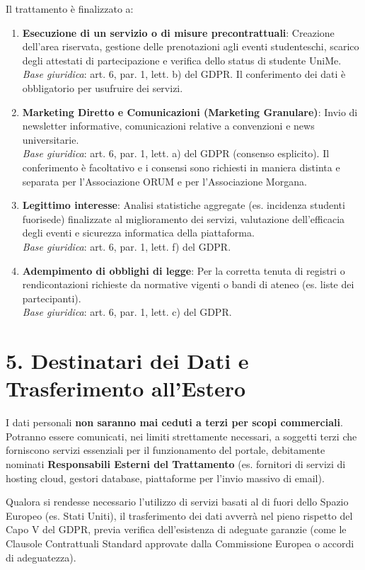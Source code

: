 \documentclass[a4paper,11pt]{article}
\begin{document}
Il trattamento è finalizzato a:
\begin{enumerate}[leftmargin=*]
    \item \textbf{Esecuzione di un servizio o di misure precontrattuali}: Creazione dell’area riservata, gestione delle prenotazioni agli eventi studenteschi, scarico degli attestati di partecipazione e verifica dello status di studente UniMe.\\
    \textit{Base giuridica}: art. 6, par. 1, lett. b) del GDPR. Il conferimento dei dati è obbligatorio per usufruire dei servizi.
    \item \textbf{Marketing Diretto e Comunicazioni (Marketing Granulare)}: Invio di newsletter informative, comunicazioni relative a convenzioni e news universitarie.\\
    \textit{Base giuridica}: art. 6, par. 1, lett. a) del GDPR (consenso esplicito). Il conferimento è facoltativo e i consensi sono richiesti in maniera distinta e separata per l'Associazione ORUM e per l'Associazione Morgana.
    \item \textbf{Legittimo interesse}: Analisi statistiche aggregate (es. incidenza studenti fuorisede) finalizzate al miglioramento dei servizi, valutazione dell'efficacia degli eventi e sicurezza informatica della piattaforma.\\
    \textit{Base giuridica}: art. 6, par. 1, lett. f) del GDPR.
    \item \textbf{Adempimento di obblighi di legge}: Per la corretta tenuta di registri o rendicontazioni richieste da normative vigenti o bandi di ateneo (es. liste dei partecipanti).\\
    \textit{Base giuridica}: art. 6, par. 1, lett. c) del GDPR.
\end{enumerate}

\section*{5. Destinatari dei Dati e Trasferimento all'Estero}

I dati personali \textbf{non saranno mai ceduti a terzi per scopi commerciali}. Potranno essere comunicati, nei limiti strettamente necessari, a soggetti terzi che forniscono servizi essenziali per il funzionamento del portale, debitamente nominati \textbf{Responsabili Esterni del Trattamento} (es. fornitori di servizi di hosting cloud, gestori database, piattaforme per l'invio massivo di email).

Qualora si rendesse necessario l'utilizzo di servizi basati al di fuori dello Spazio Europeo (es. Stati Uniti), il trasferimento dei dati avverrà nel pieno rispetto del Capo V del GDPR, previa verifica dell'esistenza di adeguate garanzie (come le Clausole Contrattuali Standard approvate dalla Commissione Europea o accordi di adeguatezza).
\end{document}
